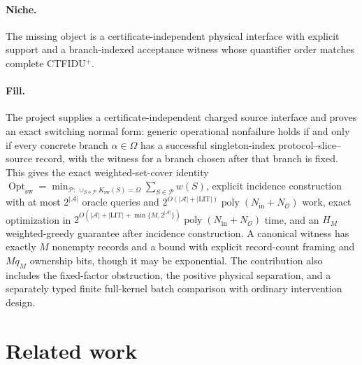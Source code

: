 \documentclass{article}
\begin{document}
\paragraph{Niche.} The missing object is a certificate-independent physical interface with explicit support and a branch-indexed acceptance witness whose quantifier order matches complete CTFIDU\({}^{+}\).

\paragraph{Fill.} The project supplies a certificate-independent charged source interface and proves an exact switching normal form: generic operational nonfailure holds if and only if every concrete branch \(\alpha\in\Omega\) has a successful singleton-index protocol--slice--source record, with the witness for a branch chosen after that branch is fixed.  This gives the exact weighted-set-cover identity \(\operatorname{Opt}_{\mathrm{sw}}=\min_{\mathcal P:\,\cup_{S\in\mathcal P}K_{\mathrm{sw}}(S)=\Omega}\sum_{S\in\mathcal P}w(S)\), explicit incidence construction with at most \(2^{|\mathcal A|}\) oracle queries and \(2^{O(|\mathcal A|+|\mathrm{LIT}|)}\operatorname{poly}(N_{\mathrm{in}}+N_{\mathcal O})\) work, exact optimization in \(2^{O(|\mathcal A|+|\mathrm{LIT}|+\min\{M,2^{|\mathcal A|}\})}\operatorname{poly}(N_{\mathrm{in}}+N_{\mathcal O})\) time, and an \(H_M\) weighted-greedy guarantee after incidence construction.  A canonical witness has exactly \(M\) nonempty records and a bound with explicit record-count framing and \(Mq_M\) ownership bits, though it may be exponential.  The contribution also includes the fixed-factor obstruction, the positive physical separation, and a separately typed finite full-kernel batch comparison with ordinary intervention design.

\section{Related work}
\end{document}

